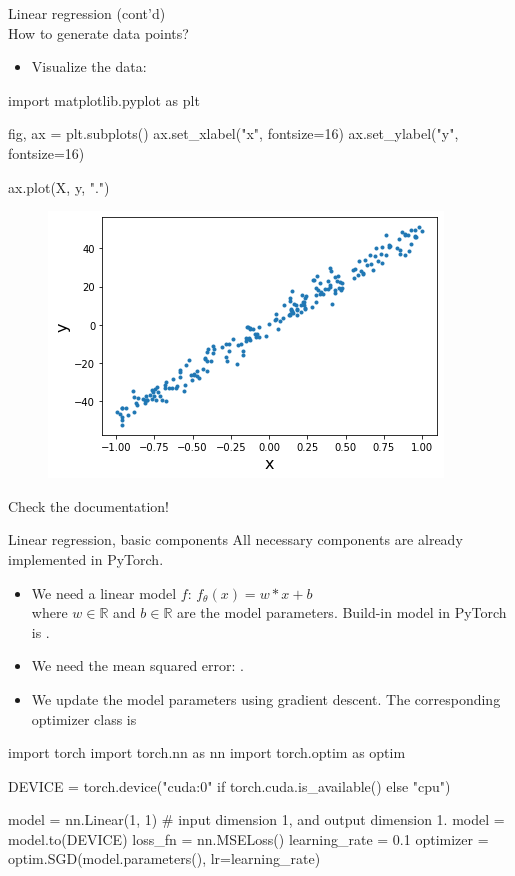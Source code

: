 \begin{frame}[fragile]{Linear regression (cont'd)\\ How to generate data points?}
\begin{itemize}
\item Visualize the data:
\end{itemize}
\begin{python}
import matplotlib.pyplot as plt

fig, ax = plt.subplots()
ax.set_xlabel("x", fontsize=16)
ax.set_ylabel("y", fontsize=16)

ax.plot(X, y, ".")
\end{python}
\begin{figure}
                        \centering
                        \includegraphics[width=.45\linewidth]{./figures/regression.png}
\end{figure}
\vspace{-5mm}
Check the documentation!
\end{frame}

\begin{frame}[fragile]{Linear regression, basic components}
\vspace{-6mm}
All necessary components are already implemented in PyTorch.
\begin{itemize}
\item We need a linear model $f$: $f_{\theta}(x) = w * x + b$\\
where $w \in \mathbb{R}$ and $b \in \mathbb{R}$ are the model parameters.
Build-in model in PyTorch is .
\item We need the mean squared error:
.
\item We update the model parameters using gradient descent.
The corresponding optimizer class is 
\end{itemize}
\begin{python}
import torch
import torch.nn as nn
import torch.optim as optim

DEVICE = torch.device("cuda:0" if torch.cuda.is_available()
                      else "cpu")

model = nn.Linear(1, 1)  # input dimension 1, and output dimension 1.
model = model.to(DEVICE)
loss_fn = nn.MSELoss()
learning_rate = 0.1
optimizer = optim.SGD(model.parameters(), lr=learning_rate)
\end{python}
\end{frame}

